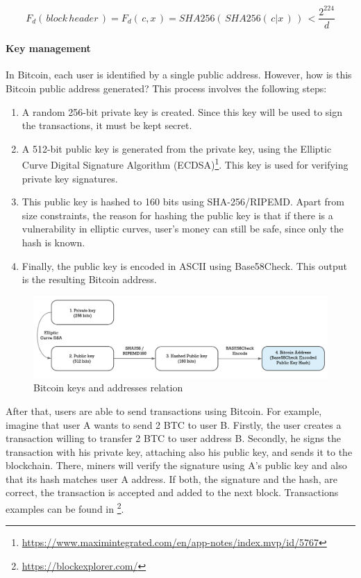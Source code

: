$$ F_d( \, block \, header \,) = F_d( \,c,x \,) = SHA256( \, SHA256( \, c|x \,) \,)\, < \frac{2^{224}}{d}$$

\paragraph{Key management}

In Bitcoin, each user is identified by a single public address. However, how is this Bitcoin public address generated? This process involves the following steps:

\begin{enumerate}
	
	\item A random 256-bit private key is created. Since this key will be used to sign the transactions, it must be kept secret.
	\item A 512-bit public key is generated from the private key, using the Elliptic Curve Digital Signature Algorithm (ECDSA)\footnote{\url{https://www.maximintegrated.com/en/app-notes/index.mvp/id/5767}}. This key is used for verifying private key signatures.
	\item This public key is hashed to 160 bits using SHA-256/RIPEMD. Apart from size constraints, the reason for hashing the public key is that if there is a vulnerability in elliptic curves, user's money can still be safe, since only the hash is known.
	\item Finally, the public key is encoded in ASCII using Base58Check. This output is the resulting Bitcoin address.
	
\end{enumerate}

\begin{figure}[bth]
  \centering
  \includegraphics[width=0.9\linewidth]{gfx/bitkeys}    
  \caption{Bitcoin keys and addresses relation \citep{BitcoinKey2018}}
  \label{fig:EthereumAccounts}
\end{figure}

After that, users are able to send transactions using Bitcoin. For example, imagine that user A wants to send 2 BTC to user B. Firstly, the user creates a transaction willing to transfer 2 BTC to user address B. Secondly, he signs the transaction with his private key, attaching also his public key, and sends it to the blockchain. There, miners will verify the signature using A's public key and also that its hash matches user A address. If both, the signature and the hash, are correct, the transaction is accepted and added to the next block. Transactions examples can be found in \footnote{\url{https://blockexplorer.com/}}.

